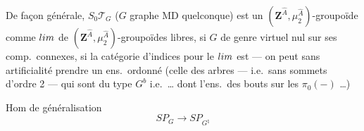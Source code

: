 \documentclass[11pt,a4paper]{article}
\begin{document}
De façon générale, $S_0\mathcal{T}_G$ ($G$ graphe MD quelconque) est un
$(\mathbf{Z}^{\hat{A}}, \mu_2^{\hat{A}})$-groupoïde 
\struck{\ill{}}  comme \emph{$\varinjlim$}  de
$(\mathbf{Z}^{\hat{A}}, \mu_2^{\hat{A}})$-groupoïdes libres, si $G$ de
genre virtuel nul sur ses comp.\ connexes, si \struck{\ill{}}  la catégorie
d'indices pour le \emph{$\varinjlim$} est \ill{} — on peut sans artificialité prendre un ens.\
ordonné (celle des arbres   — i.e.\ sans sommets d'ordre 2 — qui
sont du type $G^b$ i.e.\ \ldots{} dont l'ens.\ des bouts sur les $\pi_0(-)$ \ldots)


Hom de généralisation
\[
  SP_G \longrightarrow SP_{G^{\natural}}
\]
\end{document}
